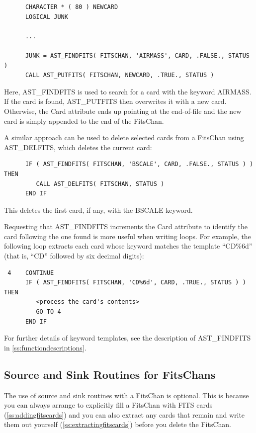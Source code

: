 \documentclass[twoside,11pt]{article}
\newcommand{\htmlref}[2]{#1}
\newcommand{\appref}[1]{Appendix~\ref{#1}}
\newcommand{\secref}[1]{\S\ref{#1}}
\renewcommand{\appref}[1]{\ref{#1}}
\renewcommand{\secref}[1]{\ref{#1}}
\begin{document}
\small
\begin{verbatim}
      CHARACTER * ( 80 ) NEWCARD
      LOGICAL JUNK

      ...

      JUNK = AST_FINDFITS( FITSCHAN, 'AIRMASS', CARD, .FALSE., STATUS )
      CALL AST_PUTFITS( FITSCHAN, NEWCARD, .TRUE., STATUS )
\end{verbatim}
\normalsize

Here, AST\_FINDFITS is used to search for a card with the keyword
AIRMASS. If the card is found, \htmlref{AST\_PUTFITS}{AST_PUTFITS} then overwrites it with a
new card.  Otherwise, the Card attribute ends up pointing at the
end-of-file and the new card is simply appended to the end of the
FitsChan.

A similar approach can be used to delete selected cards from a
FitsChan using \htmlref{AST\_DELFITS}{AST_DELFITS}, which deletes the current card:

\small
\begin{verbatim}
      IF ( AST_FINDFITS( FITSCHAN, 'BSCALE', CARD, .FALSE., STATUS ) ) THEN
         CALL AST_DELFITS( FITSCHAN, STATUS )
      END IF
\end{verbatim}
\normalsize

This deletes the first card, if any, with the BSCALE keyword.

Requesting that AST\_FINDFITS increments the Card attribute to
identify the card following the one found is more useful when writing
loops.  For example, the following loop extracts each card whose
keyword matches the template ``CD\%6d'' (that is, ``CD'' followed by
six decimal digits):

\small
\begin{verbatim}
 4    CONTINUE
      IF ( AST_FINDFITS( FITSCHAN, 'CD%6d', CARD, .TRUE., STATUS ) ) THEN
         <process the card's contents>
         GO TO 4
      END IF
\end{verbatim}
\normalsize

For further details of keyword templates, see the description of
AST\_FINDFITS in \appref{ss:functiondescriptions}.

\subsection{\label{ss:fitssourceandsink}Source and Sink Routines for FitsChans}

The use of source and sink routines with a \htmlref{FitsChan}{FitsChan} is optional. This
is because you can always arrange to explicitly fill a FitsChan with
FITS cards (\secref{ss:addingfitscards}) and you can also extract any
cards that remain and write them out yourself
(\secref{ss:extractingfitscards}) before you delete the FitsChan.
\end{document}
